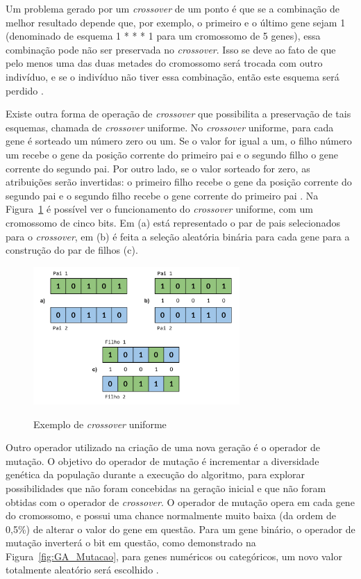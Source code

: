 \documentclass[12pt,oneside,a4paper,english,french,spanish,brazil,]{abntex2}
\begin{document}
Um problema gerado por um \textit{crossover} de um ponto é que se a combinação de melhor resultado depende que, por exemplo, o primeiro e o último gene sejam 1 (denominado de esquema 1 * * * 1 para um cromossomo de 5 genes), essa combinação pode não ser preservada no \textit{crossover}. Isso se deve ao fato de que pelo menos uma das duas metades do cromossomo será trocada com outro indivíduo, e se o indivíduo não tiver essa combinação, então este esquema será perdido \cite{linden:2008}.

Existe outra forma de operação de \textit{crossover} que possibilita a preservação de tais esquemas, chamada de \textit{crossover} uniforme. No \textit{crossover} uniforme, para cada gene é sorteado um número zero ou um. Se o valor for igual a um, o filho número um recebe o gene da posição corrente do primeiro pai e o segundo filho o gene corrente do segundo pai. Por outro lado, se o valor sorteado for zero, as atribuições serão invertidas: o primeiro filho recebe o gene da posição corrente do segundo pai e o segundo filho recebe o gene corrente do primeiro pai \cite{linden:2008}. Na Figura~\ref{fig:GA_Crossover_Uniforme} é possível ver o funcionamento do \textit{crossover} uniforme, com um cromossomo de cinco bits. Em (a) está representado o par de pais selecionados para o \textit{crossover}, em (b) é feita a seleção aleatória binária para cada gene para a construção do par de filhos (c).

\begin{figure}[ht]
\centering
\caption{Exemplo de \textit{crossover} uniforme}
\includegraphics[width=0.7\textwidth]{imagens/GA_Crossover_Uniforme.pdf}
\label{fig:GA_Crossover_Uniforme}
\end{figure}

Outro operador utilizado na criação de uma nova geração é o operador de mutação. O objetivo do operador de mutação é incrementar a diversidade genética da população durante a execução do algoritmo, para explorar possibilidades que não foram concebidas na geração inicial e que não foram obtidas com o operador de \textit{crossover}. O operador de mutação opera em cada gene do cromossomo, e possui uma chance normalmente muito baixa (da ordem de 0,5\%) de alterar o valor do gene em questão. Para um gene binário, o operador de mutação inverterá o bit em questão, como demonstrado na Figura~\ref{fig:GA_Mutacao}, para genes numéricos ou categóricos, um novo valor totalmente aleatório será escolhido \cite{linden:2008}.
\end{document}
